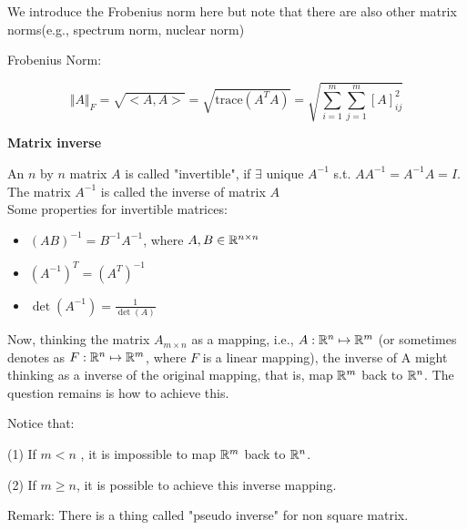 We introduce the Frobenius norm here but note that there are also other matrix norms(e.g., spectrum norm, nuclear norm)

Frobenius Norm: 

$$\Vert A\Vert _F = \sqrt{<A, A>} = \sqrt{\text{trace}(A^TA)} = \sqrt{\sum^m_{i=1}\sum^m_{j=1}[A]^2_{ij}}$$




\textbf{Matrix inverse}

An $n$ by $n$ matrix $A$ is called "invertible", if $\exists$ unique $A^{-1}$ s.t. $AA^{-1} = A^{-1}A = I$. The matrix $A^{-1}$ is called the inverse of matrix $A$\\

\vspace{0.3cm}
Some properties for invertible matrices:
\begin{itemize}
	\item $(AB)^{-1} = B^{-1}A^{-1}$, where $A, B\in\mathbb{R}^{n\times n}$
	\item $(A^{-1})^T = (A^T)^{-1}$
	\item $\det(A^{-1}) = \frac{1}{\det(A)}$
\end{itemize}

Now, thinking the matrix $A_{m\times n}$ as a mapping, i.e., $A:\mathbb{R}^{n}\mapsto\mathbb{R}^{m}$ (or sometimes denotes as $F:\mathbb{R}^{n}\mapsto\mathbb{R}^{m}$, where $F$ is a linear mapping), the inverse of A might thinking as a inverse of the original mapping, that is, map $\mathbb{R}^{m}$ back to $\mathbb{R}^{n}$. The question remains is how to achieve this. 

Notice that:

(1) If $m<n$ , it is impossible to map $\mathbb{R}^{m}$ back to $\mathbb{R}^{n}$.

(2) If $m\geq n$, it is possible to achieve this inverse mapping.

Remark: There is a thing called "pseudo inverse" for non square matrix.



